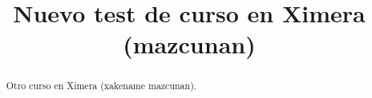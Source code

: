 \documentclass{xourse}
\title{Nuevo test de curso en Ximera (mazcunan)}
\begin{document}
  
\begin{abstract} %
Otro curso en Ximera (xakename mazcunan).  
\end{abstract}  
\maketitle  
 
 
\end{document}
